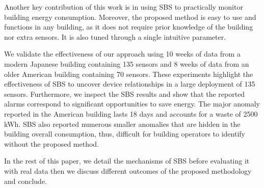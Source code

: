 Another key contribution of this work is in using SBS to practically monitor building energy consumption.
Moreover, the proposed method is easy to use and functions in any building, as it does not require prior knowledge of the building nor extra sensors.  
It is also tuned through a single intuitive parameter.  %

We validate the effectiveness of our approach using 10 weeks of data from a modern Japanese building containing 135 sensors and 
8 weeks of data from an older American building containing 70 sensors.
These experiments highlight the effectiveness of SBS to uncover device relationships in a large deployment of 135 sensors.
Furthermore, we inspect the SBS results and show that the reported alarms correspond to significant opportunities to save energy.
The major anomaly reported in the American building lasts 18 days and accounts for a waste of 2500 kWh. %
SBS also reported numerous smaller anomalies that are hidden in the building overall consumption, thus, difficult for building operators to identify without the proposed method.

In the rest of this paper, we detail the mechanisms of SBS before evaluating it with real data then we discuss different outcomes of the proposed methodology and conclude.
